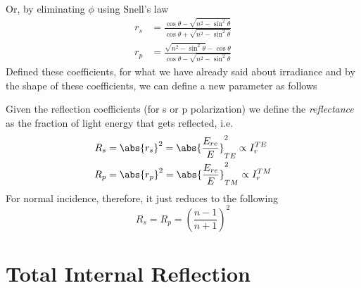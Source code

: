 \documentclass[../electromagnetism.tex]{subfiles}
\begin{document}
Or, by eliminating $\phi$ using Snell's law
\begin{equation}
	\begin{aligned}
		r_s&= \frac{\cos\theta-\sqrt{n^2-\sin^2\theta}}{\cos\theta+\sqrt{n^2-\sin^2\theta}}\\
		r_p&= \frac{\sqrt{n^2-\sin^2\theta}-\cos\theta}{\cos\theta-\sqrt{n^2-\sin^2\theta}}
	\end{aligned}
	\label{eq:fresneleq2}
\end{equation}
Defined these coefficients, for what we have already said about irradiance and by the shape of these coefficients, we can define a new parameter as follows
\begin{dfn}[Reflectance]
	Given the reflection coefficients (for s or p polarization) we define the \emph{reflectance} as the fraction of light energy that gets reflected, i.e.
	\begin{equation}
		\begin{aligned}
			R_s&= \abs{r_s}^2=\abs{\frac{E_{re}}{E}}^2_{TE}\propto I_r^{TE}\\
			R_p&= \abs{r_p}^2=\abs{\frac{E_{re}}{E}}^2_{TM}\propto I_r^{TM}
		\end{aligned}
		\label{eq:reflectancedef}
	\end{equation}
	For normal incidence, therefore, it just reduces to the following
	\begin{equation}
		R_s=R_p=\left( \frac{n-1}{n+1} \right)^2
		\label{eq:normalincidencereflectance}
	\end{equation}
\end{dfn}
\section{Total Internal Reflection}
\end{document}
